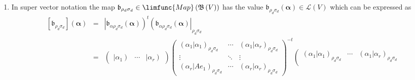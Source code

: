 \documentclass[aps,preprint]{revtex4}
\begin{document}
\begin{enumerate}
\begin{enumerate}
\begin{equation}
\begin{array}{ccc}
_{\rho _{d}\sigma _{d}} \\ 
\vdots & \ddots & \vdots \\ 
\left( \left. \alpha _{r}\right\vert Ae_{1}\right) _{\rho _{d}\sigma _{d}} & 
\cdots & \left( \left. \alpha _{r}\right\vert \alpha _{r}\right) _{\rho
_{d}\sigma _{d}}%
\end{array}%
\right) ^{-1}\left( 
\begin{array}{c}
\left( \alpha _{1}\right\vert _{\rho _{d}\sigma _{d}} \\ 
\vdots \\ 
\left( \alpha _{r}\right\vert _{\rho _{d}\sigma _{d}}%
\end{array}%
\right) .
\end{equation}

\item In super vector notation the map $\mathfrak{b}_{\rho _{d}\sigma
_{d}}\in \limfunc{Map}\left( \mathfrak{B}\left( V\right) \right) $ has the
value $\mathfrak{b}_{\rho _{d}\sigma _{d}}\left( \boldsymbol{\alpha }\right)
\in \mathcal{L}\left( V\right) $ which can be expressed as 
\begin{eqnarray}
\left[ \mathfrak{b}_{\rho _{d}\sigma _{d}}\right] \left( \boldsymbol{\alpha }%
\right) &=&\left\vert \mathfrak{b}_{\alpha \rho _{d}\sigma _{d}}\left( 
\boldsymbol{\alpha }\right) \right) ^{t}\left( \mathfrak{b}_{\alpha \rho
_{d}\sigma _{d}}\left( \boldsymbol{\alpha }\right) \right\vert _{\rho
_{d}\sigma _{d}} \\
&=&\left( 
\begin{array}{ccc}
\left\vert \alpha _{1}\right) & \cdots & \left\vert \alpha _{r}\right)%
\end{array}%
\right) \left( 
\begin{array}{ccc}
\left( \left. \alpha _{1}\right\vert \alpha _{1}\right) _{\rho _{d}\sigma
_{d}} & \cdots & \left( \left. \alpha _{1}\right\vert \alpha _{r}\right)
_{\rho _{d}\sigma _{d}} \\ 
\vdots & \ddots & \vdots \\ 
\left( \left. \alpha _{r}\right\vert Ae_{1}\right) _{\rho _{d}\sigma _{d}} & 
\cdots & \left( \left. \alpha _{r}\right\vert \alpha _{r}\right) _{\rho
_{d}\sigma _{d}}%
\end{array}%
\right) ^{-t}\left( 
\begin{array}{ccc}
\left( \left. \alpha _{1}\right\vert \alpha _{1}\right) _{\rho _{d}\sigma
_{d}} & \cdots & \left( \left. \alpha _{1}\right\vert \alpha _{r}\right)
_{\rho _{d}\sigma _{d}} \\ 

\end{array}
\end{eqnarray}
\end{enumerate}
\end{enumerate}
\end{document}
